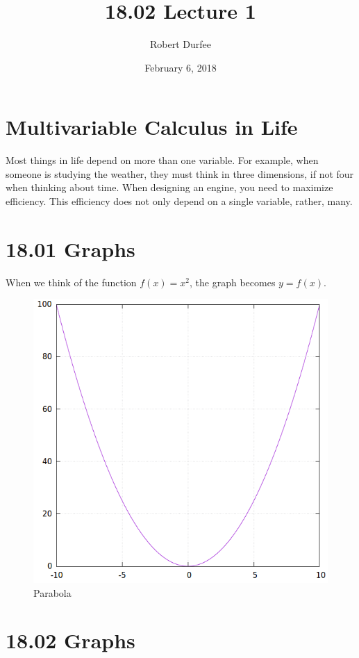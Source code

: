 \documentclass{article}
\title{ 18.02 Lecture 1 }
\author{ Robert Durfee }
\date{ February 6, 2018 }
\begin{document}
\maketitle

\section{ Multivariable Calculus in Life }

Most things in life depend on more than one variable. For example, when someone
is studying the weather, they must think in three dimensions, if not four when
thinking about time. When designing an engine, you need to maximize efficiency.
This efficiency does not only depend on a single variable, rather, many.

\section{ 18.01 Graphs }

When we think of the function $ f(x) = x^{2} $, the graph becomes $ y = f(x) $.

\begin{figure}[H]
  \centering
  \includegraphics[scale=0.40]{"Parabola"}
  \caption{Parabola}
\end{figure}

\section{ 18.02 Graphs }
\end{document}
